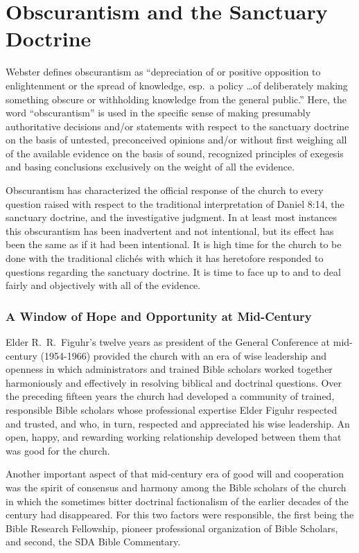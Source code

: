 \chapter{Obscurantism and the Sanctuary Doctrine}
\label{ch:obscurantism}

Webster defines obscurantism as ``depreciation of or positive opposition to
enlightenment or the spread of knowledge, esp.\ a policy \ldots of deliberately
making something obscure or withholding knowledge from the general public.''
Here, the word ``obscurantism'' is used in the specific sense of making
presumably authoritative decisions and/or statements with respect to the
sanctuary doctrine on the basis of untested, preconceived opinions and/or
without first weighing all of the available evidence on the basis of sound,
recognized principles of exegesis and basing conclusions exclusively on the
weight of all the evidence.

Obscurantism has characterized the official response of the church to every
question raised with respect to the traditional interpretation of Daniel
8:14, the sanctuary doctrine, and the investigative judgment. In at least
most instances this obscurantism has been inadvertent and not intentional,
but its effect has been the same as if it had been intentional. It is high
time for the church to be done with the traditional clichés with which it
has heretofore responded to questions regarding the sanctuary doctrine. It
is time to face up to and to deal fairly and objectively with all of the
evidence.

\subsection{A Window of Hope and Opportunity at Mid-Century}

Elder R.\ R.\ Figuhr's twelve years as president of the General Conference at
mid-century (1954-1966) provided the church with an era of wise leadership
and openness in which administrators and trained Bible scholars worked
together harmoniously and effectively in resolving biblical and doctrinal
questions. Over the preceding fifteen years the church had developed a
community of trained, responsible Bible scholars whose professional
expertise Elder Figuhr respected and trusted, and who, in turn, respected
and appreciated his wise leadership. An open, happy, and rewarding working
relationship developed between them that was good for the church.

Another important aspect of that mid-century era of good will and
cooperation was the spirit of consensus and harmony among the Bible scholars
of the church in which the sometimes bitter doctrinal factionalism of the
earlier decades of the century had disappeared. For this two factors were
responsible, the first being the Bible Research Fellowship, pioneer
professional organization of Bible Scholars, and second, the SDA Bible
Commentary.

